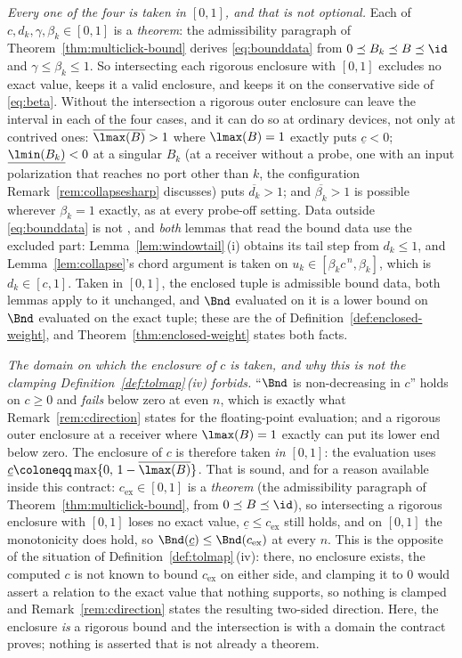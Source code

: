 \begin{remark}
\emph{Every one of the four is taken in $[0,1]$, and that is not optional.}
Each of $c,d_k,\gamma,\beta_k\in[0,1]$ is a \emph{theorem}: the
admissibility paragraph of Theorem~\ref{thm:multiclick-bound} derives
\eqref{eq:bounddata} from $0\preceq B_k\preceq B\preceq\id$ and
$\gamma\le\beta_k\le1$. So intersecting each rigorous enclosure with $[0,1]$
excludes no exact value, keeps it a valid enclosure, and keeps it on the
conservative side of \eqref{eq:beta}. Without the intersection a rigorous outer
enclosure can leave the interval in each of the four cases, and it can do so
at ordinary devices, not only at contrived ones: $\overline{\lmax(B)}>1$ where
$\lmax(B)=1$ exactly puts $\underline c<0$; $\underline{\lmin(B_k)}<0$ at a
singular $B_k$ (at a receiver without a probe, one with an input polarization
that reaches no port other than $k$, the configuration
Remark~\ref{rem:collapsesharp} discusses) puts $\overline{d_k}>1$; and
$\overline{\beta_k}>1$ is possible wherever $\beta_k=1$ exactly, as at every
probe-off setting. Data outside \eqref{eq:bounddata} is not
, and \emph{both} lemmas that read the bound data use the
excluded part: Lemma~\ref{lem:windowtail}\,(i) obtains its tail step from
$d_k\le1$, and Lemma~\ref{lem:collapse}'s chord argument is taken on
$u_k\in[\beta_kc^{\,n},\beta_k]$, which is $d_k\in[c,1]$. Taken in $[0,1]$, the
enclosed tuple is admissible bound data, both lemmas apply to it unchanged, and
$\Bnd$ evaluated on it is a lower bound on $\Bnd$ evaluated on the exact
tuple; these are the  of
Definition~\ref{def:enclosed-weight}, and Theorem~\ref{thm:enclosed-weight}
states both facts.

\emph{The domain on which the enclosure of $c$ is taken, and why this is not
the clamping Definition~\ref{def:tolmap}\,(iv) forbids.} ``$\Bnd$ is
non-decreasing in $c$'' holds on $c\ge0$ and \emph{fails} below zero at even
$n$, which is exactly what Remark~\ref{rem:cdirection} states for the
floating-point evaluation; and a rigorous outer enclosure at a receiver
where $\lmax(B)=1$ exactly can put its lower end below zero. The
enclosure of $c$ is therefore taken \emph{in $[0,1]$}: the evaluation uses
$\underline c\coloneqq\max\{0,\,1-\overline{\lmax(B)}\}$. That is sound, and
for a reason available inside this contract: $c_{\mathrm{ex}}\in[0,1]$ is a
\emph{theorem} (the admissibility paragraph of Theorem~\ref{thm:multiclick-bound},
from $0\preceq B\preceq\id$), so intersecting a rigorous enclosure with $[0,1]$
loses no exact value, $\underline c\le c_{\mathrm{ex}}$ still holds, and on
$[0,1]$ the monotonicity does hold, so
$\Bnd(\underline c)\le\Bnd(c_{\mathrm{ex}})$ at every $n$. This is the
opposite of the situation of Definition~\ref{def:tolmap}\,(iv): there, no
enclosure exists, the computed $c$ is not known to bound $c_{\mathrm{ex}}$ on
either side, and clamping it to $0$ would assert a relation to the exact value
that nothing supports, so nothing is clamped and
Remark~\ref{rem:cdirection} states the resulting two-sided direction. Here, the
enclosure \emph{is} a rigorous bound and the intersection is with a domain the
contract proves; nothing is asserted that is not already a theorem.


\end{remark}
